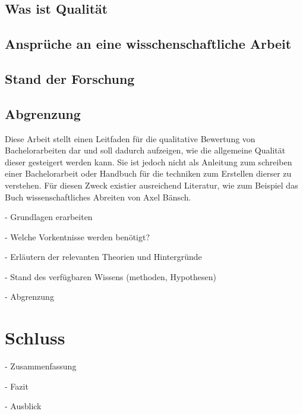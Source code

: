 \subsection{Was ist Qualität}

\subsection{Ansprüche an eine wisschenschaftliche Arbeit}

\subsection{Stand der Forschung}


\subsection{Abgrenzung}
Diese Arbeit stellt einen Leitfaden für die qualitative Bewertung von Bachelorarbeiten dar und soll dadurch aufzeigen, wie die allgemeine Qualität dieser gesteigert werden kann. Sie ist jedoch nicht als Anleitung zum schreiben einer Bachelorarbeit oder Handbuch für die techniken zum Erstellen dierser zu verstehen. Für diesen Zweck existier ausreichend Literatur, wie zum Beispiel das Buch wissenschaftliches Abreiten von Axel Bänsch\cite{Baensch:2013}.

- Grundlagen erarbeiten

- Welche Vorkentnisse werden benötigt?

- Erläutern der relevanten Theorien und Hintergründe

- Stand des verfügbaren Wissens (methoden, Hypothesen)

- Abgrenzung


\section{Schluss}

- Zusammenfassung

- Fazit

- Ausblick
